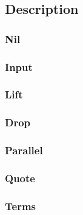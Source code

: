 \subsection{Description}

\subsubsection{Nil}

\subsubsection{Input}

\subsubsection{Lift}

\subsubsection{Drop}

\subsubsection{Parallel}

\subsubsection{Quote}

\subsubsection{Terms}